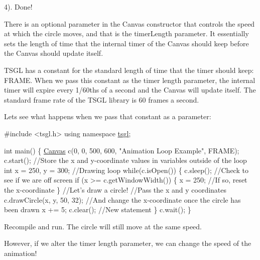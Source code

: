 4). Done!

There is an optional parameter in the Canvas constructor that controls the speed at which the circle moves, and that is the timer\+Length parameter. It essentially sets the length of time that the internal timer of the Canvas should keep before the Canvas should update itself.

T\+S\+G\+L has a constant for the standard length of time that the timer should keep\+: F\+R\+A\+M\+E. When we pass this constant as the timer length parameter, the internal timer will expire every 1/60ths of a second and the Canvas will update itself. The standard frame rate of the T\+S\+G\+L library is 60 frames a second.

Let\textquotesingle{}s see what happens when we pass that constant as a parameter\+:


\begin{DoxyCode}
\textcolor{preprocessor}{#include <tsgl.h>}
\textcolor{keyword}{using namespace }\hyperlink{namespacetsgl}{tsgl};

\textcolor{keywordtype}{int} main() \{
  \hyperlink{classtsgl_1_1_canvas}{Canvas} c(0, 0, 500, 600, \textcolor{stringliteral}{"Animation Loop Example"}, FRAME);
  c.start();
  \textcolor{comment}{//Store the x and y-coordinate values in variables outside of the loop}
  \textcolor{keywordtype}{int} x = 250, y = 300;
  \textcolor{comment}{//Drawing loop}
  \textcolor{keywordflow}{while}(c.isOpen()) \{
    c.sleep();
    \textcolor{comment}{//Check to see if we are off screen}
    \textcolor{keywordflow}{if} (x >= c.getWindowWidth()) \{
       x = 250; \textcolor{comment}{//If so, reset the x-coordinate}
    \}
    \textcolor{comment}{//Let's draw a circle!}
    \textcolor{comment}{//Pass the x and y coordinates}
    c.drawCircle(x, y, 50, 32);
    \textcolor{comment}{//And change the x-coordinate once the circle has been drawn}
    x += 5;
    c.clear(); \textcolor{comment}{//New statement}
  \}
  c.wait();
\}
\end{DoxyCode}


Recompile and run. The circle will still move at the same speed.

However, if we alter the timer length parameter, we can change the speed of the animation!



